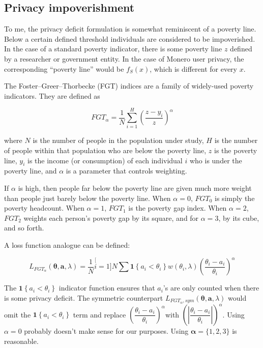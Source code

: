 \documentclass[english]{article}
\begin{document}
\subsection{Privacy impoverishment}

To me, the privacy deficit formulation is somewhat reminiscent of
a poverty line. Below a certain defined threshold individuals are
considered to be impoverished. In the case of a standard poverty indicator,
there is some poverty line $z$ defined by a researcher or government
entity. In the case of Monero user privacy, the corresponding ``poverty
line'' would be $f_{S}(x)$, which is different for every $x$.

The Foster--Greer--Thorbecke (FGT) indices are a family of widely-used
poverty indicators. They are defined as

\[
FGT_{\alpha}=\frac{1}{N}\sum_{i=1}^{H}\left(\dfrac{z-y_{i}}{z}\right)^{\alpha}
\]

where $N$ is the number of people in the population under study,
$H$ is the number of people within that population who are below
the poverty line, $z$ is the poverty line, $y_{i}$ is the income
(or consumption) of each individual $i$ who is under the poverty
line, and $\alpha$ is a parameter that controls weighting. 

If $\alpha$ is high, then people far below the poverty line are given
much more weight than people just barely below the poverty line. When
$\alpha=0$, $FGT_{0}$ is simply the poverty headcount. When $\alpha=1$,
$FGT_{1}$ is the poverty gap index. When $\alpha=2$, $FGT_{2}$
weights each person's poverty gap by its square, and for $\alpha=3$,
by its cube, and so forth.

A loss function analogue can be defined:

\begin{equation}
L_{FGT_{\alpha}}(\boldsymbol{\theta},\boldsymbol{a},\lambda)=\dfrac{1}{N}\stackrel[i=1]{N}{\sum}\boldsymbol{1}\left\{ a_{i}<\theta_{i}\right\} w(\theta_{i},\lambda)\left(\dfrac{\theta_{i}-a_{i}}{\theta_{i}}\right)^{\alpha}\label{eq:L-FGT}
\end{equation}

The $\boldsymbol{1}\left\{ a_{i}<\theta_{i}\right\} $ indicator function
ensures that $a_{i}$'s are only counted when there is some privacy
deficit. The symmetric counterpart $L_{FGT_{\alpha},sym}(\boldsymbol{\theta},\boldsymbol{a},\lambda)$
would omit the $\boldsymbol{1}\left\{ a_{i}<\theta_{i}\right\} $
term and replace $\left(\dfrac{\theta_{i}-a_{i}}{\theta_{i}}\right)^{\alpha}$with
$\left(\left|\dfrac{\theta_{i}-a_{i}}{\theta_{i}}\right|\right)^{\alpha}$.
Using $\alpha=0$ probably doesn't make sense for our purposes. Using
$\boldsymbol{\alpha}=\{1,2,3\}$ is reasonable. 
\end{document}
